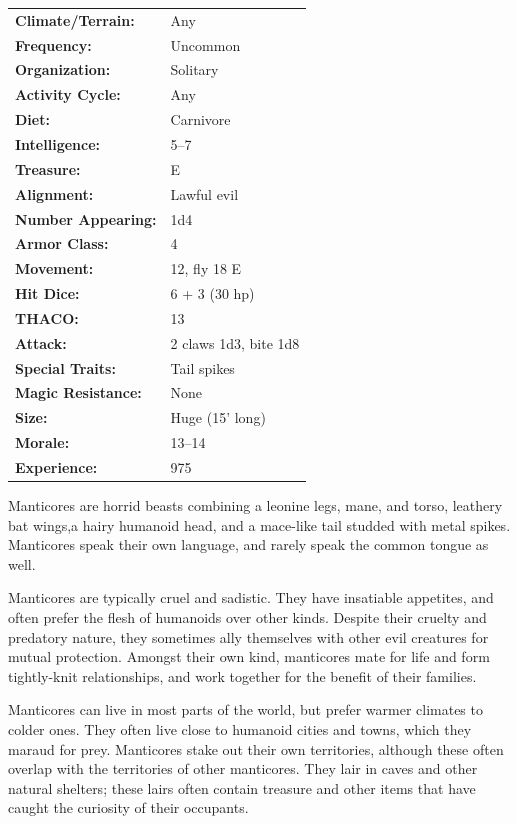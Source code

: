 \begin{multicols}{2}
\begin{minipage}{\columnwidth}
\noindent \begin{tabular}{p{}p{}}
\textbf{Climate/Terrain:}	& Any	\\
\textbf{Frequency:} 		& Uncommon	\\
\textbf{Organization:} 		& Solitary	\\
\textbf{Activity Cycle:} 	& Any	\\
\textbf{Diet:} 				& Carnivore	\\
\textbf{Intelligence:} 		& 5--7	\\
\textbf{Treasure:} 			& E	\\
\textbf{Alignment:} 		& Lawful evil	\\
\hline
\textbf{Number Appearing:} 	& 1d4	\\
\textbf{Armor Class:} 		& 4	\\
\textbf{Movement:} 			& 12, fly 18 E	\\
\textbf{Hit Dice:} 			& 6 + 3 (30 hp)	\\
\textbf{THACO:} 			& 13	\\
\textbf{Attack:} 			& 2 claws 1d3, bite 1d8	\\
\textbf{Special Traits:} & Tail spikes	\\
\textbf{Magic Resistance:} 	& None	\\
\textbf{Size:} 				& Huge (15' long)	\\
\textbf{Morale:} 			& 13--14	\\
\textbf{Experience:} 		& 975	\\ %
\end{tabular}

\end{minipage}

Manticores are horrid beasts combining a leonine legs, mane, and torso, leathery bat wings,a hairy humanoid head, and a mace-like tail studded with metal spikes. Manticores speak their own language, and rarely speak the common tongue as well.

Manticores are typically cruel and sadistic. They have insatiable appetites, and often prefer the flesh of humanoids over other kinds. Despite their cruelty and predatory nature, they sometimes ally themselves with other evil creatures for mutual protection. Amongst their own kind, manticores mate for life and form tightly-knit relationships, and work together for the benefit of their families.

Manticores can live in most parts of the world, but prefer warmer climates to colder ones. They often live close to humanoid cities and towns, which they maraud for prey. Manticores stake out their own territories, although these often overlap with the territories of other manticores. They lair in caves and other natural shelters; these lairs often contain treasure and other items that have caught the curiosity of their occupants.


\end{multicols}
